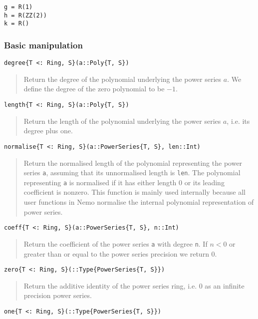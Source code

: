 \documentclass[a4paper,10pt]{article}
\newcommand{\code}{\lstinline}
\newcommand{\desc}[1]{\vspace{-3mm}\begin{quote}#1\end{quote}}
\begin{document}
{{\begin{lstlisting}
g = R(1)
h = R(ZZ(2))
k = R()
\end{lstlisting}

\subsubsection{Basic manipulation}

\begin{lstlisting}
degree{T <: Ring, S}(a::Poly{T, S})
\end{lstlisting}

\desc{Return the degree of the polynomial underlying the power series $a$.
We define the degree of the zero polynomial to be $-1$.}

\begin{lstlisting}
length{T <: Ring, S}(a::Poly{T, S})
\end{lstlisting}

\desc{Return the length of the polynomial underlying the power series $a$, i.e.
its degree plus one.}

\begin{lstlisting}
normalise{T <: Ring, S}(a::PowerSeries{T, S}, len::Int)
\end{lstlisting}

\desc{Return the normalised length of the polynomial representing the power
series \code{a}, assuming that its unnormalised length is \code{len}. The
polynomial representing \code{a} is normalised if it has either length $0$
or its leading coefficient is nonzero. This function is mainly used internally
because all user functions in Nemo normalise the internal polynomial
representation of power series.}

\begin{lstlisting}
coeff{T <: Ring, S}(a::PowerSeries{T, S}, n::Int)
\end{lstlisting}

\desc{Return the coefficient of the power series \code{a} with degree 
\code{n}. If $n < 0$ or greater than or equal to the power series precision
we return $0$.}

\begin{lstlisting}
zero{T <: Ring, S}(::Type{PowerSeries{T, S}})
\end{lstlisting}

\desc{Return the additive identity of the power series ring, i.e. $0$ as an
infinite precision power series.}

\begin{lstlisting}
one{T <: Ring, S}(::Type{PowerSeries{T, S}})
\end{lstlisting}

}}
\end{document}
